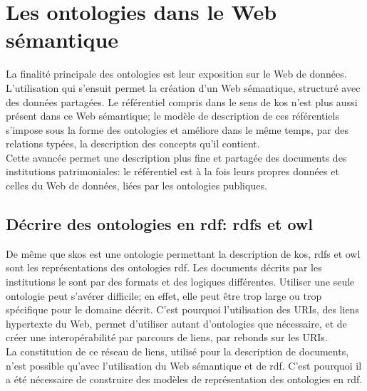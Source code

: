 \section{\label{II-B-3}Les ontologies dans le Web sémantique}

La finalité principale des ontologies est leur exposition sur le Web de données. L'utilisation qui s'ensuit permet la création d'un Web sémantique, structuré avec des données partagées. Le référentiel compris dans le sens de \ac{kos} n'est plus aussi présent dans ce Web sémantique; le modèle de description de ces référentiels s'impose sous la forme des ontologies et améliore dans le même temps, par des relations typées, la description des concepts qu'il contient.\\

Cette avancée permet une description plus fine et partagée des documents des institutions patrimoniales: le référentiel est à la fois leurs propres données et celles du Web de données, liées par les ontologies publiques.

\subsection{\label{II-B-3-a}Décrire des ontologies en \ac{rdf}: \ac{rdfs} et \ac{owl}}

De même que \ac{skos} est une ontologie permettant la description de \ac{kos}, \ac{rdfs} et \ac{owl} sont les représentations des ontologies \ac{rdf}. Les documents décrits par les institutions le sont par des formats et des logiques différentes. Utiliser une seule ontologie peut s'avérer difficile; en effet, elle peut être trop large ou trop spécifique pour le domaine décrit. C'est pourquoi l'utilisation des URIs, des liens hypertexte du Web, permet d'utiliser autant d'ontologies que nécessaire, et de créer une interopérabilité par parcours de liens, par rebonds sur les URIs.\\

La constitution de ce réseau de liens, utilisé pour la description de documents, n'est possible qu'avec l'utilisation du Web sémantique et de \ac{rdf}. C'est pourquoi il a été nécessaire de construire des modèles de représentation des ontologies en \ac{rdf}.\\

